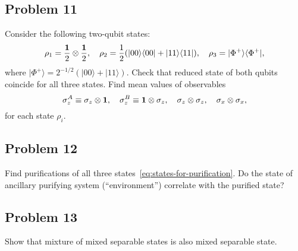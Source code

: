 \documentclass[a4paper,10pt]{article}
\newcommand{\ket}[1]{|#1\rangle}
\newcommand{\bra}[1]{\langle#1|}
\begin{document}
\subsection*{Problem 11}
Consider the following two-qubit states:
\begin{equation} \label{eq:states-for-purification}
	\rho_1= \frac{{\bf 1}}{2}\otimes \frac{{\bf 1}}{2}, \quad \rho_{2}=\frac{1}{2}(\ket{00}\bra{00}+\ket{11}\bra{11}), \quad \rho_{3}=\ket{\Phi^{+}}\bra{\Phi^{+}},
\end{equation}
where $\ket{\Phi^{+}}=2^{-1/2}(\ket{00}+\ket{11})$.
Check that reduced state of both qubits coincide for all three states.
Find mean values of observables
\begin{equation}
	\sigma_{z}^{A}\equiv \sigma_{z}\otimes {\bf 1}, \quad \sigma_{z}^{B}\equiv {\bf 1}\otimes  \sigma_{z}, \quad \sigma_{z}\otimes\sigma_{z}, \quad \sigma_{x}\otimes\sigma_{x},
\end{equation}
for each state $\rho_{i}$.


\subsection*{Problem 12}
Find purifications of all three states~\eqref{eq:states-for-purification}.
Do the state of ancillary purifying system (``environment'') correlate with the purified state?


\subsection*{Problem 13}
Show that mixture of mixed separable states is also mixed separable state.
\end{document}

